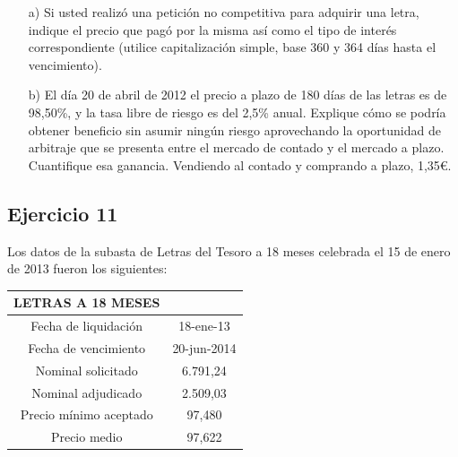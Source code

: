     \begin{enumerate}
        \item[a)] Si usted realizó una petición no competitiva para adquirir una letra, indique el precio que pagó por la misma así como el tipo de interés correspondiente (utilice capitalización simple, base 360 y 364 días hasta el vencimiento).
        
        \item[b)] El día 20 de abril de 2012 el precio a plazo de 180 días de las letras es de 98,50\%, y la tasa libre de riesgo es del 2,5\% anual. Explique cómo se podría obtener beneficio sin asumir ningún riesgo aprovechando la oportunidad de arbitraje que se presenta entre el mercado de contado y el mercado a plazo. Cuantifique esa ganancia. Vendiendo al contado y comprando a plazo, 1,35€.
    \end{enumerate}

    \subsection*{Ejercicio 11}

    Los datos de la subasta de Letras del Tesoro a 18 meses celebrada el 15 de enero de 2013 fueron los siguientes:

    \begin{table}[h!]
        \centering
        \begin{tabular}{|c|c|}
            \hline
            \textbf{LETRAS A 18 MESES} & \textbf{ } \\
            \hline
            Fecha de liquidación & 18-ene-13 \\
            \hline
            Fecha de vencimiento & 20-jun-2014 \\
            \hline
            Nominal solicitado & 6.791,24 \\
            \hline
            Nominal adjudicado & 2.509,03 \\
            \hline
            Precio mínimo aceptado & 97,480 \\
            \hline
            Precio medio & 97,622 \\
            \hline
        \end{tabular}
    \end{table}

